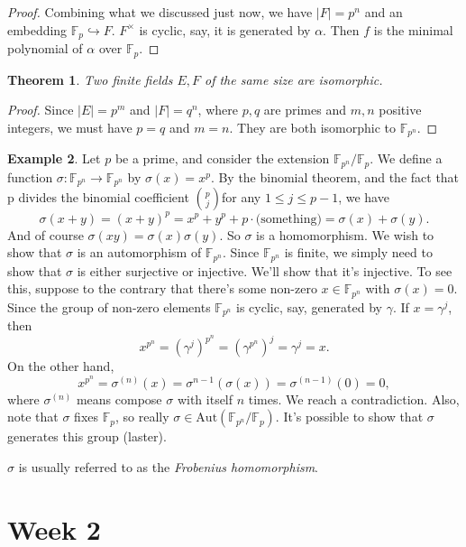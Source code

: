 \documentclass[12pt]{report}
\newtheorem{theorem}{Theorem}[section]
\theoremstyle{definition}
\newtheorem{example}[theorem]{Example}
\newcommand{\Aut}{\text{Aut}}
\newcommand{\FF}{\mathbb{F}}
\begin{document}
\begin{proof}
	Combining what we discussed just now, we have $|F|=p^n$ and an embedding $\FF_p \hookrightarrow F$.
	$F^\times$ is cyclic, say, it is generated by $\alpha$. Then $f$ is the minimal polynomial of $\alpha$ over $\FF_p$.
\end{proof}

\begin{theorem}
	Two finite fields $E,F$ of the same size are isomorphic.
\end{theorem}

\begin{proof}
	Since $|E|=p^m$ and $|F|=q^n$, where $p,q$ are primes and $m,n$ positive integers, we must have $p=q$ and $m=n$. They are both isomorphic to $\FF_{p^n}$.
\end{proof}

\begin{example}
	Let $p$ be a prime, and consider the extension $\FF_{p^n}/\FF_p$. We define a function $\sigma: \FF_{p^n} \to \FF_{p^n}$ by $\sigma(x) = x^p$. By the binomial theorem, and the fact that p divides the binomial coefficient $\binom{p}{j}$for any $1 \leq j \leq p-1$, we have $$\sigma(x + y) = (x + y)^p = x^p + y^p + p\cdot \mbox{(something)} = \sigma(x) + \sigma(y).$$
	And of course $\sigma(xy) = \sigma(x)\sigma(y)$. So $\sigma$ is a homomorphism. We wish to show that $\sigma$ is an automorphism of $\FF_{p^n}$. Since $\FF_{p^n}$ is finite, we simply need to show that $\sigma$ is either surjective or injective. We'll show that it's injective. To see this, suppose to the contrary that there's some non-zero $x \in \FF_{p^n}$ with $\sigma(x) = 0$. Since the group of non-zero elements $\FF_{p^n}$ is cyclic, say, generated by $\gamma$. If $x =\gamma^j$, then $$x^{p^n} = (\gamma^j)^{p^n} = (\gamma^{p^n})^j = \gamma^j = x.$$
	On the other hand,  $$x^{p^n}= \sigma^{(n)}(x) = \sigma^{n-1}(\sigma(x)) = \sigma^{(n-1)}(0) = 0,$$ where $\sigma^{(n)}$ means compose $\sigma$ with itself $n$ times. We reach a contradiction.
	Also, note that $\sigma$ fixes $\FF_p$, so really $\sigma \in \Aut(\FF_{p^n}/\FF_p)$. It's possible to show that $\sigma$ generates this group (laster).

	$\sigma$ is usually referred to as the \emph{Frobenius homomorphism}.
\end{example}

\chapter*{Week 2}
\setcounter{chapter}{2}
\end{document}
